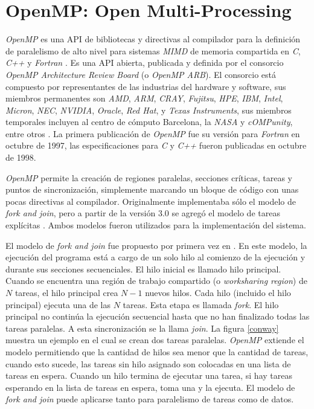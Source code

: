 
\section{OpenMP: Open Multi-Processing}

\label{mt_openmp}

\emph{OpenMP} es una API de bibliotecas y directivas al compilador para la
definición de paralelismo de alto nivel para sistemas \emph{MIMD} de memoria
compartida en \emph{C}, \emph{C++} y \emph{Fortran} \cite{ompWeb}. Es una API
abierta, publicada y definida por el consorcio \emph{OpenMP Architecture Review
Board} (o \emph{OpenMP ARB}). El consorcio está compuesto por representantes de
las industrias del hardware y software, sus miembros permanentes son \emph{AMD},
\emph{ARM}, \emph{CRAY}, \emph{Fujitsu}, \emph{HPE}, \emph{IBM}, \emph{Intel},
\emph{Micron}, \emph{NEC}, \emph{NVIDIA}, \emph{Oracle}, \emph{Red Hat}, y
\emph{Texas Instruments}, sus miembros temporales incluyen al centro de cómputo
Barcelona, la \emph{NASA} y \emph{cOMPunity}, entre otros \cite{ompWeb}. La
primera publicación de \emph{OpenMP} fue su versión para \emph{Fortran} en
octubre de 1997, las especificaciones para \emph{C} y \emph{C++} fueron
publicadas en octubre de 1998.

\emph{OpenMP} permite la creación de regiones paralelas, secciones críticas,
tareas y puntos de sincronización, simplemente marcando un bloque de código
con unas pocas directivas al compilador. Originalmente implementaba sólo el
modelo de \emph{fork and join}, pero a partir de la versión 3.0 se agregó el
modelo de tareas explícitas \cite{openmp08}. Ambos modelos fueron utilizados
para la implementación del sistema.

El modelo de \emph{fork and join} fue propuesto por primera vez en
\cite{conway1963}. En este modelo, la ejecución del programa está a cargo de un
solo hilo al comienzo de la ejecución y durante sus secciones secuenciales. El
hilo inicial es llamado hilo principal. Cuando se encuentra una región de
trabajo compartido (o \emph{worksharing region}) de $N$ tareas, el hilo
principal crea $N-1$ nuevos hilos. Cada hilo (incluido el hilo principal)
ejecuta una de las $N$ tareas. Esta etapa es llamada \emph{fork}. El hilo
principal no continúa la ejecución secuencial hasta que no han finalizado todas
las tareas paralelas. A esta sincronización se la llama \emph{join}. La figura
\ref{conway} muestra un ejemplo en el cual se crean dos tareas paralelas.
\emph{OpenMP} extiende el modelo permitiendo que la cantidad de hilos sea menor
que la cantidad de tareas, cuando esto sucede, las tareas sin hilo asignado son
colocadas en una lista de tareas en espera. Cuando un hilo termina de ejecutar
una tarea, si hay tareas esperando en la lista de tareas en espera, toma una y
la ejecuta. El modelo de \emph{fork and join} puede aplicarse tanto para
paralelismo de tareas como de datos.

